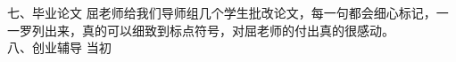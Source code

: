 \documentclass[12pt,twiside,a4paper]{ctexbook}
\numberwithin{chapter}{part}
\begin{document}
七、毕业论文    屈老师给我们导师组几个学生批改论文，每一句都会细心标记，一一罗列出来，真的可以细致到标点符号，对屈老师的付出真的很感动。\\
八、创业辅导    当初
\end{document}

